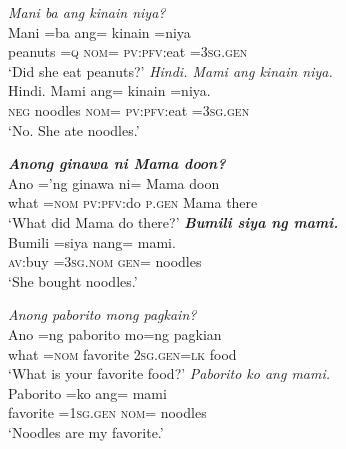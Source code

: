 \documentclass[output=paper]{langsci/langscibook}
\begin{document}
\begin{exe}
	\ex\label{f}
	\begin{xlist}
		 \textit{Mani ba ang kinain niya?}\\
		\gll Mani    =ba  ang=  k{\USSmaller}in{\USGreater}ain  =niya{\USQMark}\\
		peanuts  =\textsc{q}  \textsc{nom}=  \textsc{pv}:\textsc{pfv}:eat  =\textsc{3sg}.\textsc{gen}\\
		\glt ‘Did she eat peanuts?’
		  \textit{Hindi.  Mami ang kinain niya.}\\
		\gll Hindi.  Mami    ang=  k{\USSmaller}in{\USGreater}ain  =niya.\\
		\textsc{neg}  noodles  \textsc{nom}=  \textsc{pv}:\textsc{pfv}:eat  =\textsc{3sg}.\textsc{gen}\\
		\glt ‘No. She ate noodles.’
	\end{xlist}
\end{exe}

\begin{exe}
	\ex\label{g}
	\begin{xlist}
		 \textit{\textbf{Anong ginawa ni Mama doon?}}\\
		\gll Ano  =’ng  g{\USSmaller}in{\USGreater}awa  ni=  Mama  doon{\USQMark}\\
		what  =\textsc{nom}  \textsc{pv}:\textsc{pfv}:do  \textsc{p.gen} Mama  there\\
		\glt ‘What did Mama do there?’
		  \textit{\textbf{Bumili siya ng mami.}}\\
		\gll B{\USSmaller}um{\USGreater}ili  =siya    nang=  mami.\\
		\textsc{av}:buy  =\textsc{3sg}.\textsc{nom} \textsc{gen}=  noodles\\
		\glt ‘She bought noodles.’
	\end{xlist}
\end{exe}

\begin{exe}
	\ex\label{h}
	\begin{xlist}
		 \textit{Anong paborito mong pagkain?}\\
		\gll Ano  =ng  paborito  mo=ng  pagkian{\USQMark}\\
		what  =\textsc{nom}  favorite  \textsc{2sg}.\textsc{gen}=\textsc{lk}  food\\
		\glt ‘What is your favorite food?’
		  \textit{Paborito ko ang mami.}\\
		\gll Paborito  =ko    ang=  mami\\
		favorite  =\textsc{1sg}.\textsc{gen}  \textsc{nom}=  noodles\\
		\glt ‘Noodles are my favorite.’
	\end{xlist}
\end{exe}
\end{document}
